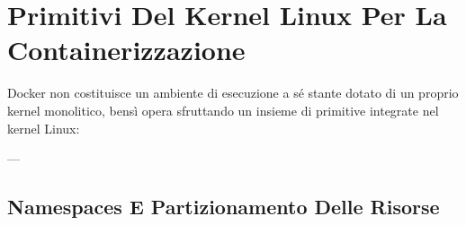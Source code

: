 \documentclass[11pt, a4paper]{article}
\begin{document}
\section{Primitivi Del Kernel Linux Per La Containerizzazione}

Docker non costituisce un ambiente di esecuzione a sé stante dotato di un proprio kernel monolitico, bensì opera sfruttando un insieme di primitive integrate nel kernel Linux:


---

\subsection{Namespaces E Partizionamento Delle Risorse}
\end{document}
